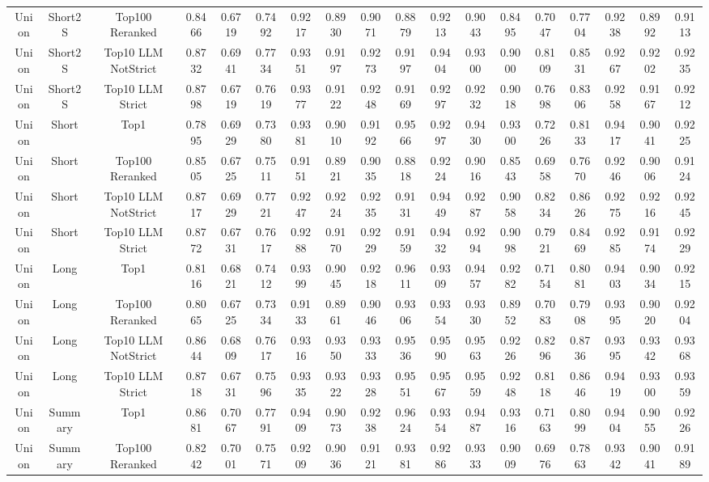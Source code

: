 \documentclass[11pt]{article}
\begin{document}
\begin{table*}[h]
{\begin{tabular}{ccc|ccc|ccc|ccc|ccc|ccc}
Union & Short2S & Top100 Reranked & 0.8466 & 0.6719 & 0.7492 & 0.9217 & 0.8930 & 0.9071 & 0.8879 & 0.9213 & 0.9043 & 0.8495 & 0.7047 & 0.7704 & 0.9238 & 0.8992 & 0.9113 \\
Union & Short2S & Top10 LLM NotStrict & 0.8732 & 0.6941 & 0.7734 & 0.9351 & 0.9197 & 0.9273 & 0.9197 & 0.9404 & 0.9300 & 0.9000 & 0.8109 & 0.8531 & 0.9267 & 0.9202 & 0.9235 \\
Union & Short2S & Top10 LLM Strict & 0.8798 & 0.6719 & 0.7619 & 0.9377 & 0.9122 & 0.9248 & 0.9169 & 0.9297 & 0.9232 & 0.9018 & 0.7698 & 0.8306 & 0.9258 & 0.9167 & 0.9212 \\
Union & Short & Top1 & 0.7895 & 0.6929 & 0.7380 & 0.9381 & 0.9010 & 0.9192 & 0.9566 & 0.9297 & 0.9430 & 0.9300 & 0.7226 & 0.8133 & 0.9417 & 0.9041 & 0.9225 \\
Union & Short & Top100 Reranked & 0.8505 & 0.6725 & 0.7511 & 0.9151 & 0.8921 & 0.9035 & 0.8818 & 0.9224 & 0.9016 & 0.8543 & 0.6958 & 0.7670 & 0.9246 & 0.9006 & 0.9124 \\
Union & Short & Top10 LLM NotStrict & 0.8717 & 0.6929 & 0.7721 & 0.9247 & 0.9224 & 0.9235 & 0.9131 & 0.9449 & 0.9287 & 0.9058 & 0.8234 & 0.8626 & 0.9275 & 0.9216 & 0.9245 \\
Union & Short & Top10 LLM Strict & 0.8772 & 0.6731 & 0.7617 & 0.9288 & 0.9170 & 0.9229 & 0.9159 & 0.9432 & 0.9294 & 0.9098 & 0.7921 & 0.8469 & 0.9285 & 0.9174 & 0.9229 \\
Union & Long & Top1 & 0.8116 & 0.6821 & 0.7412 & 0.9399 & 0.9045 & 0.9218 & 0.9611 & 0.9309 & 0.9457 & 0.9282 & 0.7154 & 0.8081 & 0.9403 & 0.9034 & 0.9215 \\
Union & Long & Top100 Reranked & 0.8065 & 0.6725 & 0.7334 & 0.9133 & 0.8961 & 0.9046 & 0.9306 & 0.9354 & 0.9330 & 0.8952 & 0.7083 & 0.7908 & 0.9395 & 0.9020 & 0.9204 \\
Union & Long & Top10 LLM NotStrict & 0.8644 & 0.6809 & 0.7617 & 0.9316 & 0.9350 & 0.9333 & 0.9536 & 0.9590 & 0.9563 & 0.9226 & 0.8296 & 0.8736 & 0.9395 & 0.9342 & 0.9368 \\
Union & Long & Top10 LLM Strict & 0.8718 & 0.6731 & 0.7596 & 0.9335 & 0.9322 & 0.9328 & 0.9551 & 0.9567 & 0.9559 & 0.9248 & 0.8118 & 0.8646 & 0.9419 & 0.9300 & 0.9359 \\
Union & Summary & Top1 & 0.8681 & 0.7067 & 0.7791 & 0.9409 & 0.9073 & 0.9238 & 0.9624 & 0.9354 & 0.9487 & 0.9316 & 0.7163 & 0.8099 & 0.9404 & 0.9055 & 0.9226 \\
Union & Summary & Top100 Reranked & 0.8242 & 0.7001 & 0.7571 & 0.9209 & 0.9036 & 0.9121 & 0.9381 & 0.9286 & 0.9333 & 0.9009 & 0.6976 & 0.7863 & 0.9342 & 0.9041 & 0.9189 \\

\end{tabular}}
\end{table*}
\end{document}

